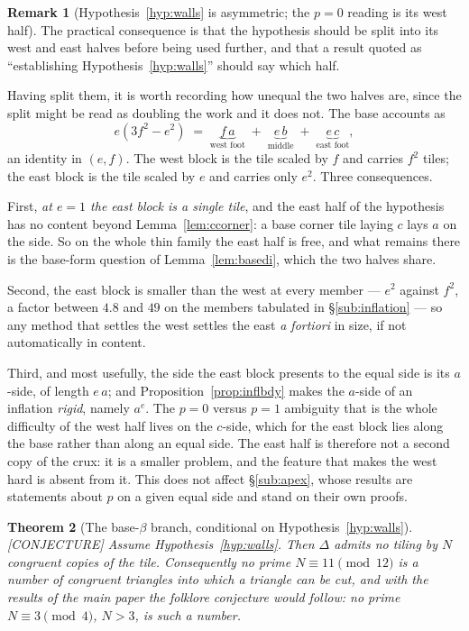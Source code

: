 \documentclass[11pt,reqno]{amsart}
\theoremstyle{plain}
\newtheorem{theorem}{Theorem}
\theoremstyle{definition}
\newtheorem{remark}[theorem]{Remark}
\newcommand{\lab}[1]{\hfill\textnormal{\footnotesize\textsc{[#1]}}}
\begin{document}
\begin{remark}[Hypothesis~\ref{hyp:walls} is asymmetric; the $p=0$ reading is its west half]
The practical consequence is that the hypothesis should be split into its west and east halves before
being used further, and that a result quoted as ``establishing Hypothesis~\ref{hyp:walls}'' should say
which half.

Having split them, it is worth recording how unequal the two halves are, since the split might be read
as doubling the work and it does not. The base accounts as
\[
  e(3f^2-e^2)\;=\;\underbrace{f\,a}_{\text{west foot}}\;+\;\underbrace{e\,b}_{\text{middle}}\;+\;\underbrace{e\,c}_{\text{east foot}},
\]
an identity in $(e,f)$. The west block is the tile scaled by $f$ and carries $f^2$ tiles; the east block
is the tile scaled by $e$ and carries only $e^2$. Three consequences.

First, \emph{at $e=1$ the east block is a single tile}, and the east half of the hypothesis has no
content beyond Lemma~\ref{lem:ccorner}: a base corner tile laying $c$ lays $a$ on the side. So on the
whole thin family the east half is free, and what remains there is the base-form question of
Lemma~\ref{lem:basedi}, which the two halves share.

Second, the east block is smaller than the west at every member --- $e^2$ against $f^2$, a factor
between $4.8$ and $49$ on the members tabulated in \S\ref{sub:inflation} --- so any method that settles
the west settles the east \emph{a fortiori} in size, if not automatically in content.

Third, and most usefully, the side the east block presents to the equal side is its $a$-side, of length
$e\,a$; and Proposition~\ref{prop:inflbdy} makes the $a$-side of an inflation \emph{rigid}, namely
$a^{e}$. The $p=0$ versus $p=1$ ambiguity that is the whole difficulty of the west half lives on the
$c$-side, which for the east block lies along the base rather than along an equal side. The east half is
therefore not a second copy of the crux: it is a smaller problem, and the feature that makes the west
hard is absent from it. This does not affect \S\ref{sub:apex}, whose results are statements about $p$ on a given
equal side and stand on their own proofs.
\end{remark}

\begin{theorem}[The base-$\beta$ branch, conditional on Hypothesis~\ref{hyp:walls}]\label{thm:basebeta-full}\lab{CONJECTURE}
Assume Hypothesis~\ref{hyp:walls}. Then $\Delta$ admits no tiling by $N$ congruent copies of the
tile. Consequently no prime $N\equiv 11 \pmod{12}$ is a number of congruent triangles into which a
triangle can be cut, and with the results of the main paper the folklore conjecture would follow:
no prime $N\equiv 3\pmod 4$, $N>3$, is such a number.
\end{theorem}
\end{document}
